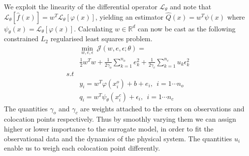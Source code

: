 We exploit the linearity of the differential operator $\mathcal{L}_{\theta}$ and note that 
$\mathcal{L}_{\theta} [\hat{f}(x)] = w^{T} \mathcal{L}_{\theta}[\varphi(x)]$, yielding an estimator 
$\hat{Q}(x) = w^{T}\psi(x)$ where $\psi_{\theta}(x) = \mathcal{L}_{\theta}[\varphi(x)]$. 
Calculating $w \in \mathbb{R}^d$ can now be cast as the following constrained $L_2$ regularised 
least squares problem.
%
\begin{equation}\label{eq:surrogate}
   \begin{aligned}
    & \min_{w,e,\epsilon} \ \mathcal{J}(w,e,\epsilon;\theta) = \\
    & \frac{1}{2} w^{T}w + \frac{1}{2\gamma_{o}} \sum_{k = 1}^{n_{o}}{e^{2}_{k}} + 
      \frac{1}{2\gamma_{c}} \sum_{k = 1}^{n_{c}}{u_{k} \epsilon^{2}_{k}} \\
    s.t & \\
    & y_{i}  = w^{T}\varphi(x^{o}_{i}) + b + e_{i}, \ \ i = 1 \cdots n_{o} \\
    & q_{i} = w^{T}\psi_{\theta}(x^{c}_{i}) + \epsilon_{i}, \ \ i = 1 \cdots n_{c}
   \end{aligned}
\end{equation}
%
The quantities $\gamma_{o}$ and $\gamma_{c}$ are weights attached to the errors on observations and 
colocation points respectively. Thus by smoothly varying them we can assign higher or lower 
importance to the surrogate model, in order to fit the observational data and the dynamics of the 
physical system. The quantities $u_i$ enable us to weigh each colocation point differently. 

